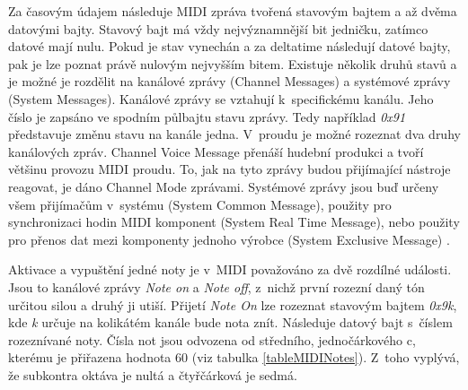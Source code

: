 Za časovým údajem následuje MIDI zpráva tvořená stavovým bajtem 
a až dvěma datovými bajty.
Stavový bajt má vždy nejvýznamnější bit jedničku,
zatímco datové mají nulu.
Pokud je stav vynechán a za deltatime následují datové bajty, 
pak je lze poznat právě nulovým nejvyšším bitem.
Existuje několik druhů stavů a je možné je rozdělit na 
kanálové zprávy (Channel Messages) 
a systémové zprávy (System Messages).
Kanálové zprávy se vztahují k~specifickému kanálu.
Jeho číslo je zapsáno ve spodním půlbajtu stavu zprávy.
Tedy například \emph{0x91} představuje změnu stavu na kanále jedna.
V~proudu je možné rozeznat dva druhy kanálových zpráv.
Channel Voice Message přenáší hudební produkci 
a tvoří většinu provozu MIDI proudu.
To, jak na tyto zprávy budou přijímající nástroje reagovat, 
je dáno Channel Mode zprávami.
Systémové zprávy jsou buď 
určeny všem přijímačům v~systému (System Common Message),
použity pro synchronizaci hodin MIDI komponent (System Real Time Message), 
nebo použity pro přenos dat mezi komponenty jednoho výrobce 
(System Exclusive Message) 
\cite{Back_SMF_Specif}.
\par

Aktivace a vypuštění jedné noty je v~MIDI považováno za dvě rozdílné události.
Jsou to kanálové zprávy \emph{Note on} a \emph{Note off},
z~nichž první rozezní daný tón určitou silou a druhý ji utiší.
Přijetí \emph{Note On} lze rozeznat stavovým bajtem \emph{0x9k}, 
kde \emph{k} určuje na kolikátém kanále bude nota znít.
Následuje datový bajt s~číslem rozeznívané noty.
Čísla not jsou odvozena od středního, jednočárkového c, 
kterému je přiřazena hodnota 60 (viz tabulka \ref{tableMIDINotes}).
Z~toho vyplývá, že subkontra oktáva je nultá a čtyřčárková je sedmá.



